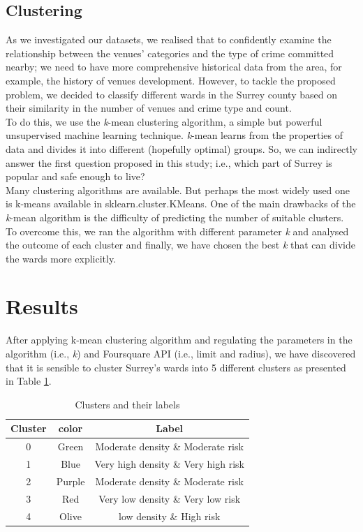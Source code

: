 \documentclass[12pt]{article}
\begin{document}
\subsection{Clustering}
As we investigated our datasets, we realised that to confidently examine the relationship between the venues' categories and the type of crime committed nearby; we need to have more comprehensive historical data from the area, for example, the history of venues development. However, to tackle the proposed problem, we decided to classify different wards in the Surrey county based on their similarity in the number of venues and crime type and count. 
\\\indent To do this, we use the \emph{k}-mean clustering algorithm, a simple but powerful unsupervised machine learning technique. \emph{k}-mean learns from the properties of data and divides it into different (hopefully optimal) groups. So, we can indirectly answer the first question proposed in this study; i.e., which part of Surrey is popular and safe enough to live?
\\\indent Many clustering algorithms are available. But perhaps the most widely used one is k-means available in sklearn.cluster.KMeans. One of the main drawbacks of the \emph{k}-mean algorithm is the difficulty of predicting the number of suitable clusters. To overcome this, we ran the algorithm with different parameter \emph{k} and analysed the outcome of each cluster and finally, we have chosen the best \emph{k} that can divide the wards more explicitly. 

\section{Results}\label{results}
After applying k-mean clustering algorithm and regulating the parameters in the algorithm (i.e., \emph{k}) and Foursquare API (i.e., limit and radius), we have discovered that it is sensible to cluster Surrey's wards  into 5 different clusters as presented in Table \ref{tb:clustersLabels}.
\begin{table}[ht]
\caption{Clusters and their labels} %
\centering %
\begin{tabular}{c c c } %
\hline\hline %
Cluster & color & Label  \\ [0.5ex] %
\hline %
0 & Green &Moderate density \& Moderate risk\\ %
1 & Blue & Very high density \& Very high risk \\
2 & Purple & Moderate density \& Moderate risk\\
3 & Red &Very low density \& Very low risk \\
4 & Olive & low density \& High risk\\ [1ex] %
\hline %
\end{tabular}
\label{tb:clustersLabels} %
\end{table}
\end{document}
